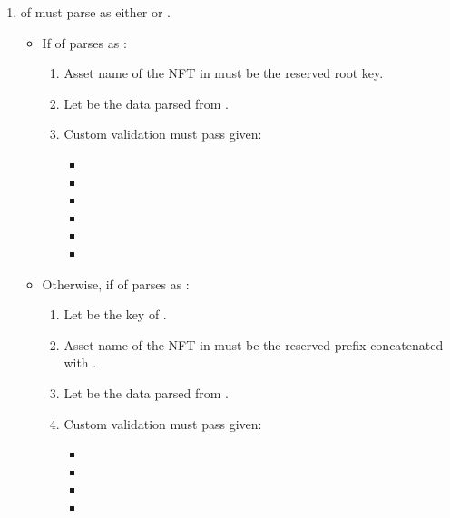 \documentclass[../midgard.tex]{subfiles}
\begin{document}
\begin{description}
\begin{enumerate}
        \item {} of  must parse as either  or .
          \begin{itemize}
            \item If  of  parses as :
              \begin{enumerate}[resume]
                \item Asset name of the NFT in  must be the reserved root key.
                \item Let  be the data parsed from .
                \item Custom validation must pass given:
                  \begin{itemize}
                    \item {}
                    \item {}
                    \item {}
                    \item {}
                    \item {}
                    \item {}
                  \end{itemize}
              \end{enumerate}
            \item Otherwise, if  of  parses as :
              \begin{enumerate}[resume]
                \item Let  be the key of .
                \item Asset name of the NFT in  must be the reserved prefix concatenated with .
                \item Let  be the data parsed from .
                \item Custom validation must pass given:
                  \begin{itemize}
                    \item {}
                    \item {}
                    \item {}
                    \item {}

\end{itemize}
\end{enumerate}
\end{itemize}
\end{enumerate}
\end{description}
\end{document}
